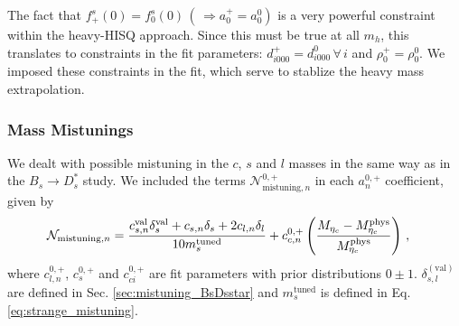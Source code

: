 The fact that $f^s_+(0) = f^s_0(0) \,(\,\Rightarrow a^+_0 = a^0_0)$ is a very powerful constraint within the heavy-HISQ approach. Since this must be true at all $m_h$, this translates to constraints in the fit parameters: $d^+_{i000}=d^0_{i000} \,\forall \,i$ and $\rho^+_0 = \rho^0_0$. We imposed these constraints in the fit, which serve to stablize the heavy mass extrapolation.

\subsubsection{Mass Mistunings}

We dealt with possible mistuning in the $c$, $s$ and $l$ masses in the same way as in the $B_s\to D_s^*$ study. We included the terms $\mathcal{N}_{\text{mistuning},n}^{0,+}$ in each $a^{0,+}_n$ coefficient, given by
\begin{align}
  \mathcal{N}_{\text{mistuning},n} &= {c_{s,n}^{\text{val}} \delta^{\text{val}}_s + c_{s,n} \delta_s + 2 c_{l,n} \delta_l \over 10 m_s^{\text{tuned}} }
    \label{eq:mistuning}
  +c_{c,n}^{0,+} \left({ M_{\eta_c} - M_{\eta_c}^{\text{phys}} \over M_{\eta_c}^{\text{phys}}}\right)\,,
\end{align}
where $c^{0,+}_{l,n}$, $c^{0,+}_s$ and $c^{0,+}_{ci}$ are fit parameters with prior distributions $0\pm 1$. $\delta_{s,l}^{(\text{val})}$ are defined in Sec. \ref{sec:mistuning_BsDsstar} and $m_s^{\text{tuned}}$ is defined in Eq. \eqref{eq:strange_mistuning}.



